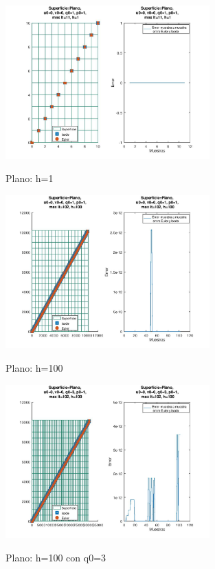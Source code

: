 \documentclass{endm}
\begin{document}
\begin{figure}[H]
\caption{Plano: h=1}
\centering
\includegraphics[width=0.7\textwidth]{plano.jpg}
\label{fig:plano}
\end{figure}

\begin{figure}[H]
\caption{Plano: h=100 }
\centering
\includegraphics[width=0.7\textwidth]{planoh100.jpg}
\label{fig:planoh100}
\end{figure}

\begin{figure}[H]
\caption{Plano: h=100 con q0=3}
\centering
\includegraphics[width=0.7\textwidth]{planoh100q03.jpg}
\label{fig:planoh100q03}
\end{figure}
\end{document}
